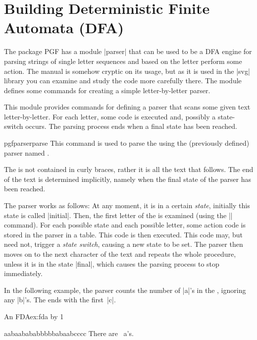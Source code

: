 \section{Building Deterministic Finite Automata (DFA)}
\label{section-module-parser}

The package PGF has a module |parser| that can be used to be a DFA engine for parsing strings of single letter sequences and based on the letter perform some action. The manual is somehow cryptic on its usage, but as it is
used in the |svg| library you can examine and study the code more carefully there.
The module defines some commands for creating a simple
  letter-by-letter parser.

This module provides commands for defining a parser that scans some
given text letter-by-letter. For each letter, some code is executed
and, possibly a state-switch occurs. The parsing process ends when a
final state has been reached.

\begin{docCmd}{pgfparserparse}{ }
  This command is used to parse the  using the (previously
  defined) parser named .

  The  is not contained in curly braces, rather it is all
  the text that follows. The end of the text is determined implicitly,
  namely when the final state of the parser has been reached.

  The parser works as follows: At any moment, it is in a certain
  \emph{state}, initially this state is called |initial|. Then, the
  first letter of the  is examined (using the |\futurlet|
  command). For each possible state and each possible letter, some
  action code is stored in the parser in a table. This code is then
  executed. This code may, but need not, trigger a \emph{state
    switch}, causing a new state to be set. The parser then moves on
  to the next character of the text and repeats the whole
  procedure, unless it is in the state |final|, which causes the
  parsing process to stop immediately.

  In the following example, the parser counts the number of |a|'s
  in the , ignoring any |b|'s. The  ends with
  the first~|c|.
\begin{texexample}{An FDA}{ex:fda}
\newcount\mycount
{}
{\advance\mycount by 1\relax}
{} %
{}%

aabaabababbbbbabaabcccc
There are \the\mycount\ a's.
\end{texexample}
\end{docCmd}

